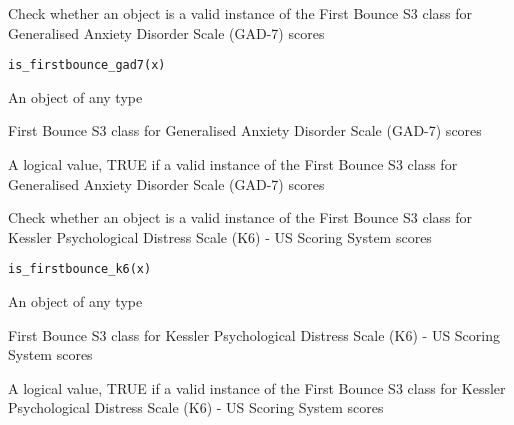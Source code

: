 \documentclass[a4paper]{book}
\begin{document}
%
\begin{Description}\relax
Check whether an object is a valid instance of the First Bounce S3 class for Generalised Anxiety Disorder Scale (GAD-7) scores
\end{Description}
%
\begin{Usage}
\begin{verbatim}
is_firstbounce_gad7(x)
\end{verbatim}
\end{Usage}
%
\begin{Arguments}
\begin{ldescription}
\item[\code{x}] An object of any type
\end{ldescription}
\end{Arguments}
%
\begin{Details}\relax
First Bounce S3 class for Generalised Anxiety Disorder Scale (GAD-7) scores
\end{Details}
%
\begin{Value}
A logical value, TRUE if a valid instance of the First Bounce S3 class for Generalised Anxiety Disorder Scale (GAD-7) scores
\end{Value}
%
\begin{Description}\relax
Check whether an object is a valid instance of the First Bounce S3 class for Kessler Psychological Distress Scale (K6) - US Scoring System scores
\end{Description}
%
\begin{Usage}
\begin{verbatim}
is_firstbounce_k6(x)
\end{verbatim}
\end{Usage}
%
\begin{Arguments}
\begin{ldescription}
\item[\code{x}] An object of any type
\end{ldescription}
\end{Arguments}
%
\begin{Details}\relax
First Bounce S3 class for Kessler Psychological Distress Scale (K6) - US Scoring System scores
\end{Details}
%
\begin{Value}
A logical value, TRUE if a valid instance of the First Bounce S3 class for Kessler Psychological Distress Scale (K6) - US Scoring System scores
\end{Value}
\end{document}
